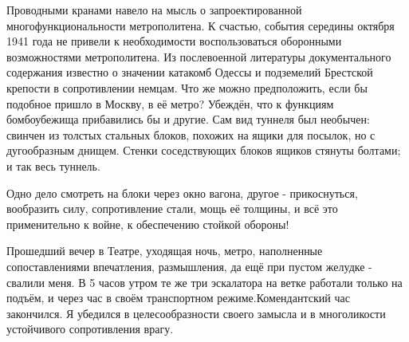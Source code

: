 \label{240-1}
Проводными кранами навело на мысль о запроектированной многофункциональности метрополитена. К счастью, события середины октября 1941 года не привели к необходимости воспользоваться оборонными возможностями метрополитена. Из послевоенной литературы документального содержания известно о значении катакомб Одессы и подземелий Брестской крепости в сопротивлении немцам. Что же можно предположить, если бы подобное пришло в Москву, в её метро? Убеждён, что к функциям бомбоубежища прибавились бы и другие. Сам вид туннеля был необычен: свинчен из толстых стальных блоков, похожих на ящики для посылок, но с дугообразным днищем. Стенки соседствующих блоков ящиков стянуты болтами; и так весь туннель.

\label{241-1}
Одно дело смотреть на блоки через окно вагона, другое - прикоснуться, вообразить силу, сопротивление стали, мощь её толщины, и всё это применительно к войне, к обеспечению стойкой обороны!

Прошедший вечер в Театре, уходящая ночь, метро, наполненные сопоставлениями впечатления, размышления, да ещё при пустом желудке - свалили меня. В 5 часов утром те же три эскалатора на ветке работали только на подъём, и через час в своём транспортном режиме.Комендантский час закончился. Я убедился в целесообразности своего замысла и в многоликости устойчивого сопротивления врагу.
